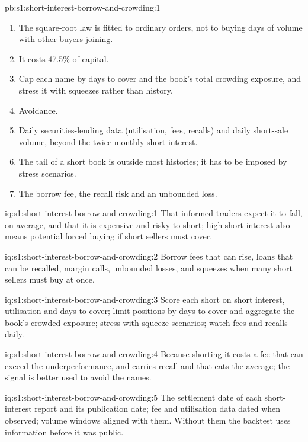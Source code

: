 \begin{solution}{pb:s1:short-interest-borrow-and-crowding:1}
\begin{enumerate}
\item The square-root law is fitted to ordinary orders, not to buying days of volume with other buyers joining.
\item It costs 47.5\% of capital.
\item Cap each name by days to cover and the book's total crowding exposure, and stress it with squeezes rather than history.
\item Avoidance.
\item Daily securities-lending data (utilisation, fees, recalls) and daily short-sale volume, beyond the twice-monthly short interest.
\item The tail of a short book is outside most histories; it has to be imposed by stress scenarios.
\item The borrow fee, the recall risk and an unbounded loss.
\end{enumerate}
\end{solution}

\begin{solution}{iq:s1:short-interest-borrow-and-crowding:1}
That informed traders expect it to fall, on average, and that it is expensive and risky to short; high short interest also means potential forced buying
if short sellers must cover.
\end{solution}

\begin{solution}{iq:s1:short-interest-borrow-and-crowding:2}
Borrow fees that can rise, loans that can be recalled, margin calls, unbounded losses, and squeezes when many short sellers must buy at once.
\end{solution}

\begin{solution}{iq:s1:short-interest-borrow-and-crowding:3}
Score each short on short interest, utilisation and days to cover; limit positions by days to cover and aggregate the book's crowded exposure; stress with
squeeze scenarios; watch fees and recalls daily.
\end{solution}

\begin{solution}{iq:s1:short-interest-borrow-and-crowding:4}
Because shorting it costs a fee that can exceed the underperformance, and carries recall and  that eats the average; the signal is better used
to avoid the names.
\end{solution}

\begin{solution}{iq:s1:short-interest-borrow-and-crowding:5}
The settlement date of each short-interest report and its publication date; fee and utilisation data dated when observed; volume windows aligned with them.
Without them the backtest uses information before it was public.
\end{solution}

